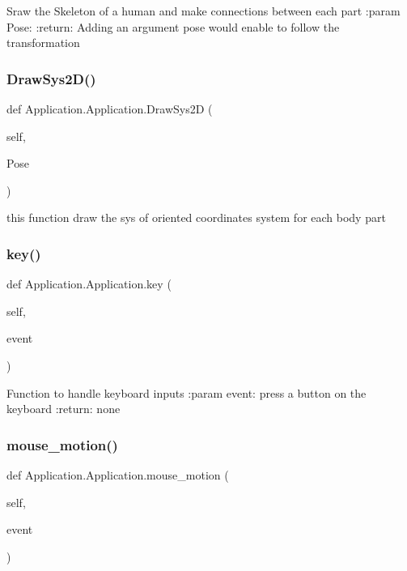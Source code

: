 \begin{DoxyVerb}Sraw the Skeleton of a human and make connections between each part
:param Pose:
:return:
Adding an argument pose would enable to follow the transformation
\end{DoxyVerb}
 \mbox{\label{class_application_1_1_application_a24fadbdd7cf0f4318724996b626e8c66}} 
\subsubsection{Draw\+Sys2\+D()}
{\footnotesize\ttfamily def Application.\+Application.\+Draw\+Sys2D (\begin{DoxyParamCaption}\item[{}]{self,  }\item[{}]{Pose }\end{DoxyParamCaption})}

\begin{DoxyVerb}this function draw the sys of oriented coordinates system for each body part\end{DoxyVerb}
 \mbox{\label{class_application_1_1_application_a7f10b75f569cab5769291c54ca1d3762}} 
\subsubsection{key()}
{\footnotesize\ttfamily def Application.\+Application.\+key (\begin{DoxyParamCaption}\item[{}]{self,  }\item[{}]{event }\end{DoxyParamCaption})}

\begin{DoxyVerb}Function to handle keyboard inputs
:param event: press a button on the keyboard
:return: none
\end{DoxyVerb}
 \mbox{\label{class_application_1_1_application_a1a6c84b431acbb546e466eaab2141e51}} 
\subsubsection{mouse\+\_\+motion()}
{\footnotesize\ttfamily def Application.\+Application.\+mouse\+\_\+motion (\begin{DoxyParamCaption}\item[{}]{self,  }\item[{}]{event }\end{DoxyParamCaption})}

